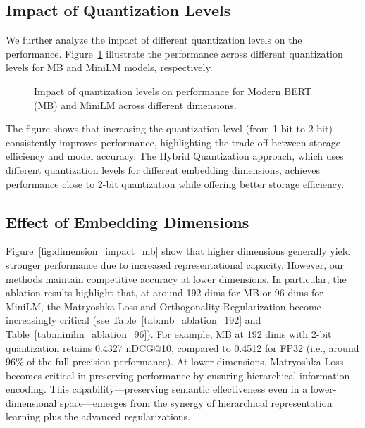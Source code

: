 \subsection{Impact of Quantization Levels}
\label{sec:quantization_levels}

We further analyze the impact of different quantization levels on the performance. 
Figure~\ref{fig:quantization_impact_mb} illustrate the performance across different quantization levels for MB and MiniLM models, respectively.

\begin{figure}[ht]
    \centering
    \caption{Impact of quantization levels on performance for Modern BERT (MB) and MiniLM across different dimensions.}
    \label{fig:quantization_impact_mb}
\end{figure}


The figure shows that increasing the quantization level (from 1-bit to 2-bit) consistently improves performance, highlighting the trade-off between storage efficiency and model accuracy. The Hybrid Quantization approach, which uses different quantization levels for different embedding dimensions, achieves performance close to 2-bit quantization while offering better storage efficiency.

\subsection{Effect of Embedding Dimensions}
\label{sec:dimension_effect}

Figure~\ref{fig:dimension_impact_mb} show that higher dimensions generally yield stronger performance due to increased representational capacity. However, our methods maintain competitive accuracy at lower dimensions.
In particular, the ablation results highlight that, at around 192 dims for MB or 96 dims for MiniLM, the Matryoshka Loss and Orthogonality Regularization become increasingly critical (see Table~\ref{tab:mb_ablation_192} and Table~\ref{tab:minilm_ablation_96}). 
For example, MB at 192 dims with 2-bit quantization retains 0.4327 nDCG@10, compared to 0.4512 for FP32 (i.e., around 96\% of the full-precision performance). 
At lower dimensions, Matryoshka Loss becomes critical in preserving performance by ensuring hierarchical information encoding.
This capability—preserving semantic effectiveness even in a lower-dimensional space—emerges from the synergy of hierarchical representation learning plus the advanced regularizations.

